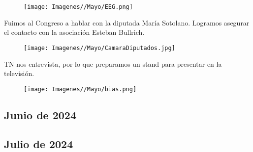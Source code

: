 \documentclass{article}
\begin{document}
\begin{figure}[H]
    \centering
    \texttt{[image: Imagenes//Mayo/EEG.png]}
\end{figure}


Fuimos al Congreso a hablar con la diputada María Sotolano. Logramos asegurar el contacto con la asociación Esteban Bullrich.

\begin{figure}[H]
    \centering
    \texttt{[image: Imagenes//Mayo/CamaraDiputados.jpg]}
\end{figure}

\newpage

TN nos entrevista, por lo que preparamos un stand para presentar en la televisión.

\begin{figure}[H]
    \centering
    \texttt{[image: Imagenes//Mayo/bias.png]}
\end{figure}




\begin{center}
    \section{Junio de 2024}
\end{center}



\newpage







\begin{center}
    \section{Julio de 2024}
\end{center}



\newpage
\end{document}
